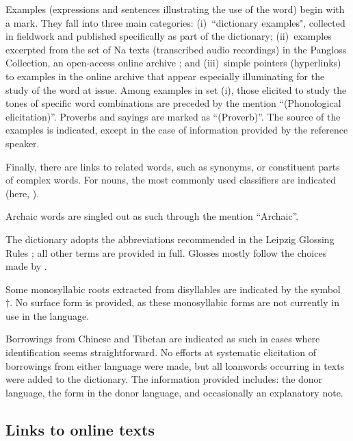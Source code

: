 Examples (expressions and sentences illustrating the use of the word) begin with a  mark. They fall into three main categories: (i)~``dictionary examples", collected in fieldwork and published specifically as part of the dictionary; (ii)~examples excerpted from the set of Na texts (transcribed audio recordings) in the Pangloss Collection, an open-access online archive \parencite[about which see ][]{michailovskyetal2014}; and (iii)~simple pointers (hyperlinks) to examples in the online archive that appear especially illuminating for the study of the word at issue. Among examples in set (i), those elicited to study the tones of specific word combinations are preceded by the mention “(Phonological elicitation)”. Proverbs and sayings are marked as “(Proverb)”. The source of the examples is indicated, except in the case of information provided by the reference speaker.

Finally, there are links to related words, such as synonyms, or constituent parts of complex words. For nouns, the most commonly used classifiers are indicated (here, ).

Archaic words are singled out as such through the mention “Archaic”.

The dictionary adopts the abbreviations recommended in the Leipzig Glossing Rules \parencite{comrieetal}; all other terms are provided in full. Glosses mostly follow the choices made by \textcite{lidz2010}.

Some monosyllabic roots extracted from disyllables are indicated by the symbol †. No surface form is provided, as these monosyllabic forms are not currently in use in the language.

Borrowings from Chinese and Tibetan are indicated as such in cases where identification seems straightforward. No efforts at systematic elicitation of borrowings from either language were made, but all loanwords occurring in texts were added to the dictionary. The information provided includes: the donor language, the form in the donor language, and occasionally an explanatory note. %



\subsection{Links to online texts}

